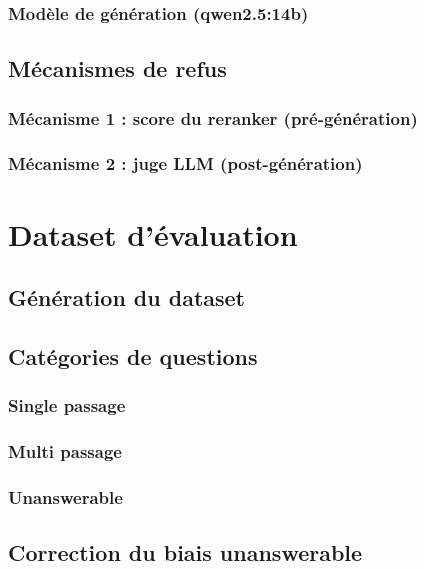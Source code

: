 \documentclass{rapportECL}
\begin{document}
\subsubsection{Modèle de génération (qwen2.5:14b)}

\subsection{Mécanismes de refus}

\subsubsection{Mécanisme 1 : score du reranker (pré-génération)}
\subsubsection{Mécanisme 2 : juge LLM (post-génération)}

\section{Dataset d'évaluation}

\subsection{Génération du dataset}

\subsection{Catégories de questions}

\subsubsection{Single passage}
\subsubsection{Multi passage}
\subsubsection{Unanswerable}

\subsection{Correction du biais unanswerable}
\end{document}
